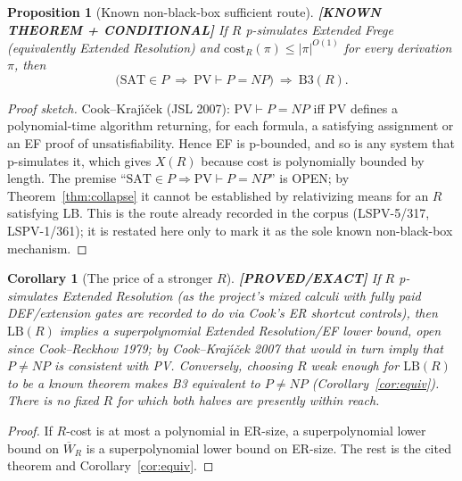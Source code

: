 \documentclass[11pt]{article}
\newtheorem{proposition}[theorem]{Proposition}
\newtheorem{corollary}[theorem]{Corollary}
\theoremstyle{definition}
\theoremstyle{remark}
\newcommand{\SAT}{\mathrm{SAT}}
\newcommand{\Wb}{\overline W}
\newcommand{\status}[1]{\textbf{[#1]}}
\begin{document}
\begin{proposition}[Known non-black-box sufficient route]\label{prop:pv}
\status{KNOWN THEOREM + CONDITIONAL}
If $R$ p-simulates Extended Frege (equivalently Extended Resolution) and
$\mathrm{cost}_R(\pi)\le|\pi|^{O(1)}$ for every derivation $\pi$, then
\[
\big(\SAT\in P\ \Rightarrow\ \mathrm{PV}\vdash P=NP\big)\ \Longrightarrow\ \mathrm{B3}(R).
\]
\end{proposition}
\begin{proof}[Proof sketch]
Cook--Kraj\'{\i}\v{c}ek (JSL 2007): $\mathrm{PV}\vdash P=NP$ iff PV defines a polynomial-time
algorithm returning, for each formula, a satisfying assignment or an EF proof of
unsatisfiability. Hence EF is p-bounded, and so is any system that p-simulates it, which gives
$X(R)$ because cost is polynomially bounded by length. The premise ``$\SAT\in P\Rightarrow\mathrm{PV}\vdash P=NP$'' is OPEN; by
Theorem~\ref{thm:collapse} it cannot be established by relativizing means for an $R$ satisfying
LB. This is the route already recorded in the corpus (LSPV-5/317, LSPV-1/361); it is restated
here only to mark it as the sole known non-black-box mechanism.
\end{proof}

\begin{corollary}[The price of a stronger $R$]\label{cor:er}
\status{PROVED/EXACT}
If $R$ p-simulates Extended Resolution (as the project's mixed calculi with fully paid
DEF/extension gates are recorded to do via Cook's ER shortcut controls), then $\mathrm{LB}(R)$
implies a superpolynomial Extended Resolution/EF lower bound, open since Cook--Reckhow 1979; by
Cook--Kraj\'{\i}\v{c}ek 2007 that would in turn imply that $P\neq NP$ is consistent with PV.
Conversely, choosing $R$ weak enough for $\mathrm{LB}(R)$ to be a known theorem makes
B3 equivalent to $P\neq NP$ (Corollary~\ref{cor:equiv}). There is no fixed $R$ for which
\emph{both} halves are presently within reach.
\end{corollary}
\begin{proof}
If $R$-cost is at most a polynomial in ER-size, a superpolynomial lower bound on $\Wb_R$ is a
superpolynomial lower bound on ER-size. The rest is the cited theorem and
Corollary~\ref{cor:equiv}.
\end{proof}
\end{document}
